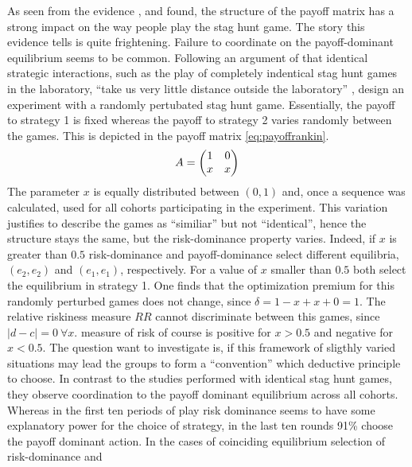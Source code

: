 \documentclass[11pt]{article}
\begin{document}
As seen from the evidence \textcite{battalio_optimization_2001},
\textcite{schmidt_playing_2003} and \textcite{dubois_optimization_2012} 
found, the structure of the payoff matrix has a strong impact on the way 
people play the stag hunt game.   
The story this evidence tells is quite frightening. Failure to coordinate 
on the payoff-dominant equilibrium seems to be common. 
Following an argument of \textcite{kreps_game_1990} that identical strategic 
interactions, such as the play of completely indentical stag hunt games 
in the laboratory, ``take us very little distance outside the laboratory'' 
\parencite[212]{kreps_game_1990}, 
\textcite{rankin_strategic_2000} design an experiment with a randomly 
pertubated stag hunt game. Essentially, the payoff to strategy 1 is fixed 
whereas the payoff to strategy 2 varies randomly between the games. This is
depicted in the payoff matrix \eqref{eq:payoffrankin}.
\begin{align}
        \label{eq:payoffrankin}
        A = \mqty(1 & 0 \\ x & x)
\end{align}        
The parameter $x$ is equally distributed between $(0,1)$ and, once a sequence
was calculated, used for all cohorts participating in the experiment. This
variation justifies to describe the games as ``similiar'' but not
``identical'', hence the structure stays the same, but the risk-dominance 
property varies. Indeed, if $x$ is greater than $0.5$ risk-dominance and
payoff-dominance select different equilibria, $(e_2,e_2)$ and $(e_1,e_1)$,
respectively. For a value of $x$ smaller than $0.5$ both select 
the equilibrium in strategy 1. One finds that the optimization premium for 
this randomly perturbed games does not change, since $\delta=1-x+x+0=1$. 
The relative riskiness measure $RR$ cannot discriminate between this games,
since $|d-c|=0\ \forall x$. \textcite{schmidt_playing_2003} measure of risk of 
course is positive for $x > 0.5$ and negative for $x <0.5$. 
The question \textcite{rankin_strategic_2000}
want to investigate is, if this framework of sligthly varied situations may
lead the groups to form a ``convention'' which deductive principle to choose. 
In contrast to the studies performed with identical stag hunt games, they 
observe coordination to the payoff dominant equilibrium across
all cohorts. Whereas in the first ten periods of play risk dominance seems
to have some explanatory power for the choice of strategy, in the last ten
rounds 91\% choose the payoff dominant action. 
In the cases of coinciding equilibrium selection of risk-dominance and 
\end{document}
